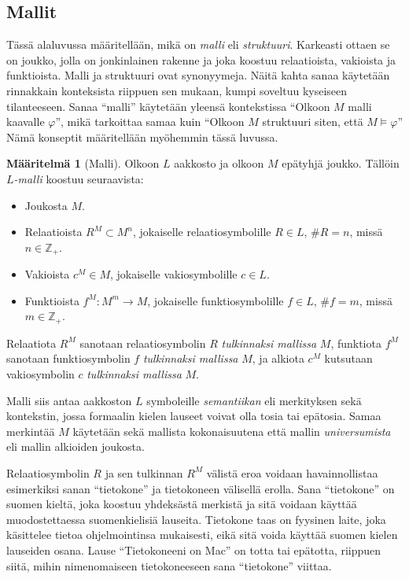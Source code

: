 \documentclass[finnish]{tktltiki2}
\theoremstyle{definition}
\newtheorem{maar}[lau]{Määritelmä}
\theoremstyle{remark}
\begin{document}
\subsection{Mallit}
Tässä alaluvussa määritellään, mikä on \textit{malli} eli \textit{struktuuri}. Karkeasti ottaen se on joukko, jolla on jonkinlainen rakenne ja joka koostuu relaatioista, vakioista ja funktioista. Malli ja struktuuri ovat synonyymeja. Näitä kahta sanaa käytetään rinnakkain konteksista riippuen sen mukaan, kumpi soveltuu kyseiseen tilanteeseen. Sanaa ``malli'' käytetään yleensä kontekstissa ``Olkoon $M$ malli kaavalle $\varphi$'', mikä tarkoittaa samaa kuin ``Olkoon $M$ struktuuri siten, että $M \models \varphi$'' Nämä konseptit määritellään myöhemmin tässä luvussa.

\begin{maar}[Malli] Olkoon $L$ aakkosto ja olkoon $M$ epätyhjä joukko. Tällöin $L$\textit{-malli} koostuu seuraavista:
\begin{itemize}
\item Joukosta $M$.
\item Relaatioista $R^M \subset M^n$, jokaiselle relaatiosymbolille $R \in L$, $\#R = n$, missä $n\in \mathbb{Z}_+$.
\item Vakioista $c^M \in M$, jokaiselle vakiosymbolille $c \in L$.
\item Funktioista $f^M: M^m \rightarrow M$, jokaiselle funktiosymbolille $f \in L$, $\#f = m$, missä $m\in \mathbb{Z}_+$.
\end{itemize}

Relaatiota $R^M$ sanotaan relaatiosymbolin $R$ \textit{tulkinnaksi mallissa} $M$, funktiota $f^M$ sanotaan funktiosymbolin $f$ \textit{tulkinnaksi mallissa} $M$, ja alkiota $c^M$ kutsutaan vakiosymbolin $c$ \textit{tulkinnaksi mallissa} $M$.
\end{maar}

Malli siis antaa aakkoston $L$ symboleille \textit{semantiikan} eli merkityksen sekä kontekstin, jossa formaalin kielen lauseet voivat olla tosia tai epätosia. Samaa merkintää $M$ käytetään sekä mallista kokonaisuutena että mallin \textit{universumista} eli mallin alkioiden joukosta.

Relaatiosymbolin $R$ ja sen tulkinnan $R^M$ välistä eroa voidaan havainnollistaa esimerkiksi sanan ``tietokone'' ja tietokoneen välisellä erolla. Sana ``tietokone'' on suomen kieltä, joka koostuu yhdeksästä merkistä ja sitä voidaan käyttää muodostettaessa suomenkielisiä lauseita. Tietokone taas on fyysinen laite, joka käsittelee tietoa ohjelmointinsa mukaisesti, eikä sitä voida käyttää suomen kielen lauseiden osana. Lause ``Tietokoneeni on Mac'' on totta tai epätotta, riippuen siitä, mihin nimenomaiseen tietokoneeseen sana ``tietokone'' viittaa.
\end{document}
